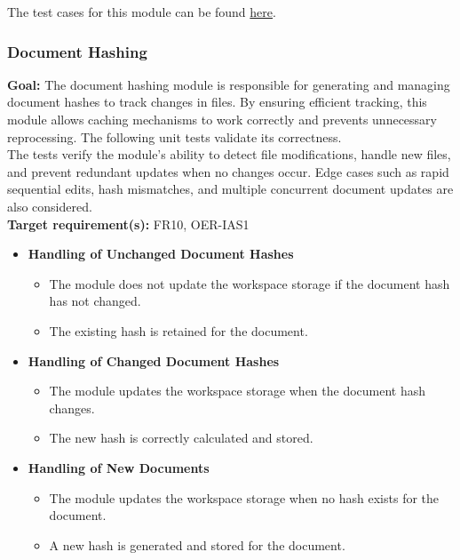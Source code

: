 \documentclass[12pt, titlepage]{article}
\begin{document}
\noindent The test cases for this module can be found \href{https://github.com/ssm-lab/capstone--sco-vs-code-plugin/blob/plugin-multi-file/test/commands/detectSmells.test.ts}{here}.

\subsubsection{Document Hashing}

\textbf{Goal:} The document hashing module is responsible for generating and managing document hashes to track changes in files. By ensuring efficient tracking, this module allows caching mechanisms to work correctly and prevents unnecessary reprocessing. The following unit tests validate its correctness.\\

\noindent The tests verify the module’s ability to detect file modifications, handle new files, and prevent redundant updates when no changes occur. Edge cases such as rapid sequential edits, hash mismatches, and multiple concurrent document updates are also considered.\\

\noindent\textbf{Target requirement(s):} FR10, OER-IAS1~\cite{SRS} \\

\begin{itemize}
    \item \textbf{Handling of Unchanged Document Hashes}
    \begin{itemize}
        \item The module does not update the workspace storage if the document hash has not changed.
        \item The existing hash is retained for the document.
    \end{itemize}

    \item \textbf{Handling of Changed Document Hashes}
    \begin{itemize}
        \item The module updates the workspace storage when the document hash changes.
        \item The new hash is correctly calculated and stored.
    \end{itemize}

    \item \textbf{Handling of New Documents}
    \begin{itemize}
        \item The module updates the workspace storage when no hash exists for the document.
        \item A new hash is generated and stored for the document.
    \end{itemize}
\end{itemize}
\end{document}

